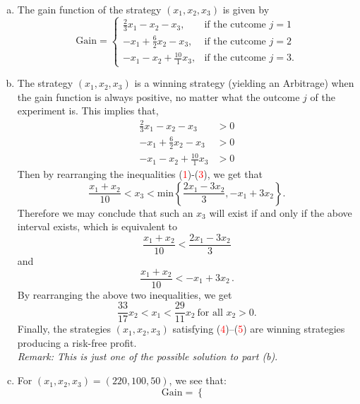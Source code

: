 \documentclass[11pt,a4paper]{article}
\begin{document}
    \begin{enumerate}[(a)]
        \item The gain function of the strategy $(x_1, x_2, x_3)$ is given by
        $$
        \text{Gain}
        =
        \begin{cases}
            \frac{2}{3}x_1-x_2-x_3, & \text{if the cutcome $j = 1$}\\
            -x_1+\frac{6}{2}x_2-x_3, & \text{if the cutcome $j = 2$}\\
            -x_1-x_2+\frac{10}{1}x_3, & \text{if the cutcome $j = 3$}.
        \end{cases}
        $$
        \item The strategy $(x_1, x_2, x_3)$ is a winning strategy (yielding an Arbitrage) when the gain function is always positive, no matter what the outcome $j$ of the experiment is. This implies that,
        \begin{align}
            \frac{2}{3}x_1-x_2-x_3 & > 0\\
            -x_1+\frac{6}{2}x_2-x_3 & > 0\\
            -x_1-x_2+\frac{10}{1}x_3 & > 0
        \end{align}
        Then by rearranging the inequalities (\textcolor{red}{1})-(\textcolor{red}{3}), we get that
        \begin{equation}
            \frac{x_1+x_2}{10}<x_3<\text{min} \left\{\frac{2x_1-3x_2}{3}, -x_1+3x_2\right\}.
        \end{equation}
        Therefore we may conclude that such an $x_3$ will exist if and only if the above interval exists, which is equivalent to
        $$
        \frac{x_1+x_2}{10}<\frac{2x_1-3x_2}{3}
        $$
        and
        $$
        \frac{x_1+x_2}{10}<-x_1+3x_2\, .
        $$
        By rearranging the above two inequalities, we get
        \begin{equation}
            \frac{33}{17}x_2<x_1<\frac{29}{11}x_2 \ \text{for all $x_2>0$}.
        \end{equation}
        Finally, the strategies $(x_1, x_2, x_3)$ satisfying (\textcolor{red}{4})–(\textcolor{red}{5}) are winning strategies producing a risk-free profit.\\
        \textsl{Remark: This is just one of the possible solution to part (b)}.
        \item For $(x_1, x_2, x_3) = (220, 100, 50)$, we see that:
        $$
        \text{Gain}
        =
        \begin{cases}

\end{cases}$$
\end{enumerate}
\end{document}
